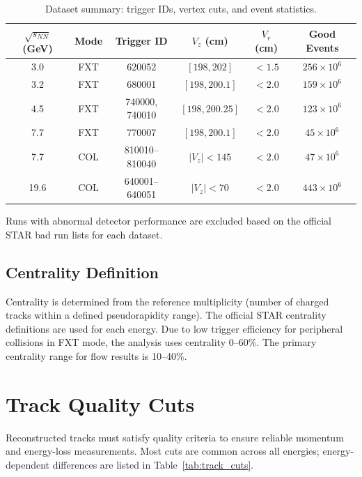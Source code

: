 \documentclass[aps,prc,preprint,superscriptaddress,nofootinbib]{revtex4-2}
\begin{document}
\begin{table}[h]
\centering
\caption{Dataset summary: trigger IDs, vertex cuts, and event statistics.}
\label{tab:dataset_summary}
\begin{tabular}{cccccc}
\toprule
$\sqrt{s_{NN}}$ (GeV) & Mode & Trigger ID & $V_z$ (cm) & $V_r$ (cm) & Good Events \\
\midrule
3.0  & FXT & 620052 & $[198, 202]$    & $< 1.5$ & $256 \times 10^{6}$ \\
3.2  & FXT & 680001 & $[198, 200.1]$  & $< 2.0$ & $159 \times 10^{6}$ \\
4.5  & FXT & 740000, 740010 & $[198, 200.25]$ & $< 2.0$ & $123 \times 10^{6}$ \\
7.7  & FXT & 770007 & $[198, 200.1]$  & $< 2.0$ & $45 \times 10^{6}$ \\
7.7  & COL & 810010--810040 & $|V_z| < 145$   & $< 2.0$ & $47 \times 10^{6}$ \\
19.6 & COL & 640001--640051 & $|V_z| < 70$    & $< 2.0$ & $443 \times 10^{6}$ \\
\bottomrule
\end{tabular}
\end{table}

Runs with abnormal detector performance are excluded based on the official STAR bad run lists for each dataset.

\subsection{Centrality Definition}
\label{subsec:centrality}

Centrality is determined from the reference multiplicity (number of charged tracks within a defined pseudorapidity range). The official STAR centrality definitions are used for each energy. Due to low trigger efficiency for peripheral collisions in FXT mode, the analysis uses centrality 0--60\%. The primary centrality range for flow results is 10--40\%.

\section{Track Quality Cuts}
\label{sec:track_cuts}

Reconstructed tracks must satisfy quality criteria to ensure reliable momentum and energy-loss measurements. Most cuts are common across all energies; energy-dependent differences are listed in Table~\ref{tab:track_cuts}.
\end{document}
